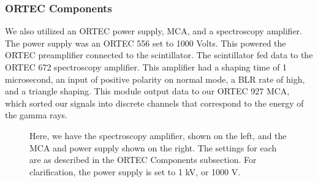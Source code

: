 \documentclass[10pt,letterpaper,onecolumn]{article}
\begin{document}
\subsubsection*{ORTEC Components}
We also utilized an ORTEC power supply, MCA, and a spectroscopy amplifier. The power supply was an ORTEC 556 set to 1000 Volts. This powered the ORTEC preamplifier connected to the scintillator. The scintillator fed data to the ORTEC 672 spectroscopy amplifier. This amplifier had a shaping time of 1 microsecond, an input of positive polarity on normal mode, a BLR rate of high, and a triangle shaping. This module output data to our ORTEC 927 MCA, which sorted our signals into discrete channels that correspond to the energy of the gamma rays.
\begin{figure}
    \begin{center}
        \qquad
        \caption{Here, we have the spectroscopy amplifier, shown on the left, and the MCA and power supply shown on the right. The settings for each are as described in the ORTEC Components subsection. For clarification, the power supply is set to 1 kV, or 1000 V.}%
        \label{fig:apparatus}%
    \end{center}
\end{figure}
\end{document}
